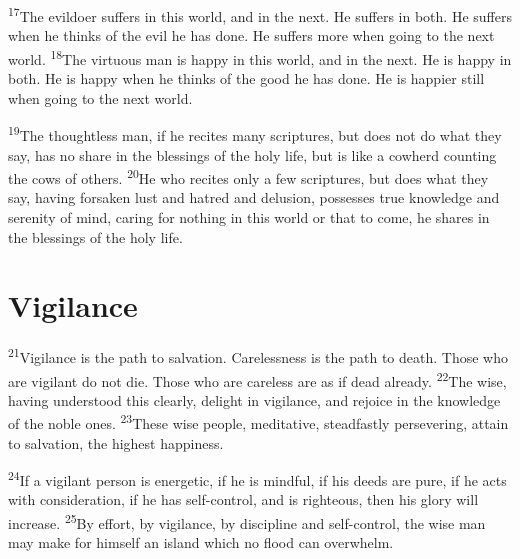 \documentclass[openany,12pt,english]{book}
\newenvironment{para}{\par\pretolerance=100\tolerance=200\setlength{\emergencystretch}{0.6em}\relax}{\par}
\begin{document}
\begin{para}
    \textsuperscript{17}\thinspace{}The evil\-do\-er suffers in this world, and in the next. He suffers in both. He suffers when he thinks of the evil he has done. He suffers more when go\-ing to the next world.
    \textsuperscript{18}\thinspace{}The vir\-tu\-ous man is hap\-py in this world, and in the next. He is hap\-py in both. He is hap\-py when he thinks of the good he has done. He is hap\-pi\-er still when go\-ing to the next world.
\end{para}

\begin{para}
    \textsuperscript{19}\thinspace{}The thought\-less man, if he recites man\-y scriptures, but does not do what they say, has no share in the blessings of the ho\-ly life, but is like a cow\-herd counting the cows of others.
    \textsuperscript{20}\thinspace{}He who recites on\-ly a few scriptures, but does what they say, hav\-ing for\-sak\-en lust and ha\-tred and de\-lu\-sion, possesses true knowl\-edge and se\-ren\-i\-ty of mind, car\-ing for noth\-ing in this world or that to come, he shares in the blessings of the ho\-ly life.
\end{para}

\section*{Vigilance}
\begin{para}
    \textsuperscript{21}\thinspace{}Vig\-i\-lance is the path to sal\-va\-tion. Care\-less\-ness is the path to death. Those who are vig\-i\-lant do not die. Those who are care\-less are as if dead al\-read\-y.
    \textsuperscript{22}\thinspace{}The wise, hav\-ing un\-der\-stood this clear\-ly, de\-light in vig\-i\-lance, and re\-joice in the knowl\-edge of the no\-ble ones.
    \textsuperscript{23}\thinspace{}These wise peo\-ple, meditative, stead\-fast\-ly per\-se\-ver\-ing, at\-tain to sal\-va\-tion, the highest hap\-pi\-ness.
\end{para}

\begin{para}
    \textsuperscript{24}\thinspace{}If a vig\-i\-lant per\-son is en\-er\-get\-ic, if he is mind\-ful, if his deeds are pure, if he acts with con\-sid\-er\-a\-tion, if he has self-control, and is right\-eous, then his glo\-ry will in\-crease.
    \textsuperscript{25}\thinspace{}By ef\-fort, by vig\-i\-lance, by dis\-ci\-pline and self-control, the wise man may make for him\-self an is\-land which no flood can o\-ver\-whelm.
\end{para}
\end{document}
